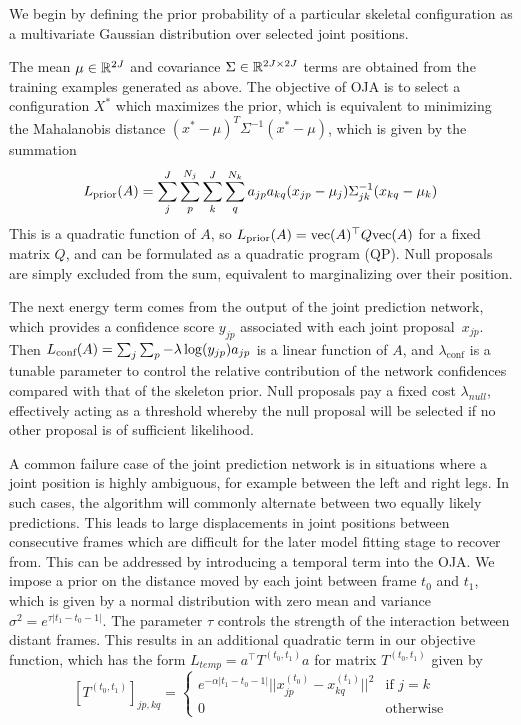    We begin by defining the prior probability of a particular skeletal configuration as a multivariate Gaussian distribution over selected joint positions.
  
  The mean $\mu \in {\mathbb{R}^{2J}}$ and covariance $\Sigma \in {\mathbb{R}^{2J\times 2J}}$ terms are obtained from the training examples generated as above. The objective of OJA is to select a configuration $X^*$ which maximizes the prior, which is equivalent to minimizing the Mahalanobis distance
  $(x^*-\mu)^T\Sigma^{-1}(x^*-\mu)$, which is given by the summation
  \begin{equation}
  L_{\text{prior}}(A) = \sum_j^J\sum_p^{N_j}\sum_k^J\sum_q^{N_k}a_{jp}a_{kq}(x_{jp} - \mu_j)\Sigma_{jk}^{-1}(x_{kq}-\mu_k)
  \end{equation}
  This is a quadratic function of $A$, so $L_{\text{prior}}(A) = \text{vec}(A)^\top Q \text{vec}(A)$ for a fixed matrix $Q$, and can be formulated as a quadratic program (QP).  Null proposals are simply excluded from the sum, equivalent to marginalizing over their position. 
  
  The next energy term comes from the output of the joint prediction network, which provides a confidence score $y_{jp}$ associated with each joint proposal~$x_{jp}$.  Then $L_{\text{conf}}(A) = \sum_j\sum_p -\lambda\log(y_{jp}) a_{jp}$ is a linear function of $A$, 
  and $\lambda_{\text{conf}}$ is a tunable parameter to control the relative contribution of the network confidences compared with that of the skeleton prior.
  Null proposals pay a fixed cost $\lambda_{null}$, effectively acting as a threshold whereby the null proposal will be selected if no other proposal is of sufficient likelihood. 
  
  A common failure case of the joint prediction network is in situations where a joint position is highly ambiguous, for example between the left and right legs. In such cases, the algorithm will commonly alternate between two equally likely predictions. This leads to large displacements in joint positions between consecutive frames which are difficult for the later model fitting stage to recover from. This can be addressed by introducing a temporal term into the OJA. We impose a prior on the distance moved by each joint between frame $t_0$ and $t_1$, which is given by a normal distribution with zero mean and variance $\sigma^{2} =e^{\tau|t_1 - t_0 - 1|}$. 
  The parameter $\tau$ controls the strength of the interaction between distant frames. This results in an additional quadratic term in our objective function, which has the form $L_{temp} = a^\top T^{(t_0, t_1)} a$ for matrix $T^{(t_0, t_1)}$ given by 
  \begin{equation}
  \left[T^{(t_0, t_1)}\right]_{jp, kq} = \begin{cases}
  e^{-\alpha|t_1 - t_0 - 1|}||x^{(t_0)}_{jp} - x^{(t_1)}_{kq}||^2 & \text{if } j=k\\
  0 & \text{otherwise}
  \end{cases}
  \end{equation}
  
